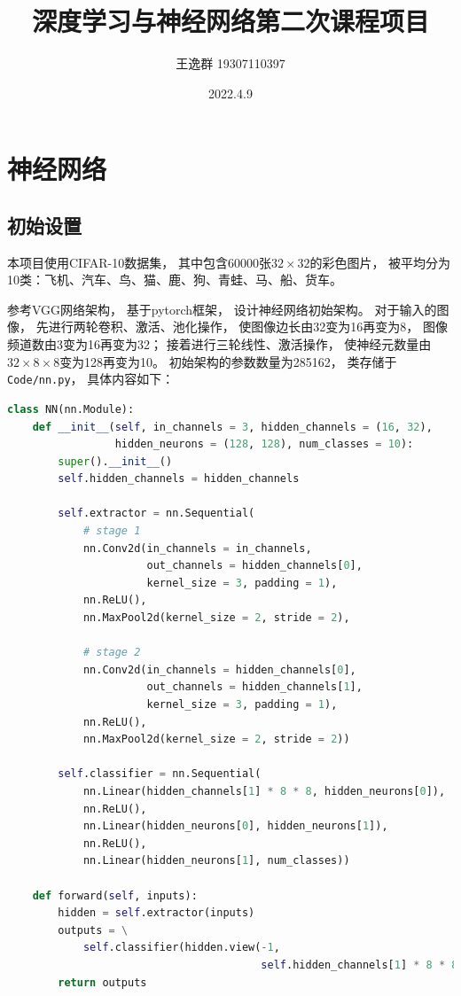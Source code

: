 \documentclass{article}
\title{深度学习与神经网络第二次课程项目}
\author{王逸群 19307110397}
\date{2022.4.9}
\begin{document}
	
\maketitle
\tableofcontents

\section{神经网络}

\subsection{初始设置}

本项目使用CIFAR-10数据集，
其中包含60000张$32\times32$的彩色图片，
被平均分为10类：飞机、汽车、鸟、猫、鹿、狗、青蛙、马、船、货车。

参考VGG网络架构，
基于pytorch框架，
设计神经网络初始架构。
对于输入的图像，
先进行两轮卷积、激活、池化操作，
使图像边长由32变为16再变为8，
图像频道数由3变为16再变为32；
接着进行三轮线性、激活操作，
使神经元数量由$32\times8\times8$变为128再变为10。
初始架构的参数数量为285162，
类存储于\verb|Code/nn.py|，
具体内容如下：

\begin{lstlisting}[language=Python]
class NN(nn.Module):
    def __init__(self, in_channels = 3, hidden_channels = (16, 32), 
                 hidden_neurons = (128, 128), num_classes = 10):
        super().__init__()
        self.hidden_channels = hidden_channels

        self.extractor = nn.Sequential(
            # stage 1
            nn.Conv2d(in_channels = in_channels,
                      out_channels = hidden_channels[0],
                      kernel_size = 3, padding = 1),
            nn.ReLU(),
            nn.MaxPool2d(kernel_size = 2, stride = 2),

            # stage 2
            nn.Conv2d(in_channels = hidden_channels[0],
                      out_channels = hidden_channels[1],
                      kernel_size = 3, padding = 1),
            nn.ReLU(),
            nn.MaxPool2d(kernel_size = 2, stride = 2))

        self.classifier = nn.Sequential(
            nn.Linear(hidden_channels[1] * 8 * 8, hidden_neurons[0]),
            nn.ReLU(),
            nn.Linear(hidden_neurons[0], hidden_neurons[1]),
            nn.ReLU(),
            nn.Linear(hidden_neurons[1], num_classes))

    def forward(self, inputs):
        hidden = self.extractor(inputs)
        outputs = \
            self.classifier(hidden.view(-1,
                                        self.hidden_channels[1] * 8 * 8))
        return outputs
\end{lstlisting}
\end{document}
